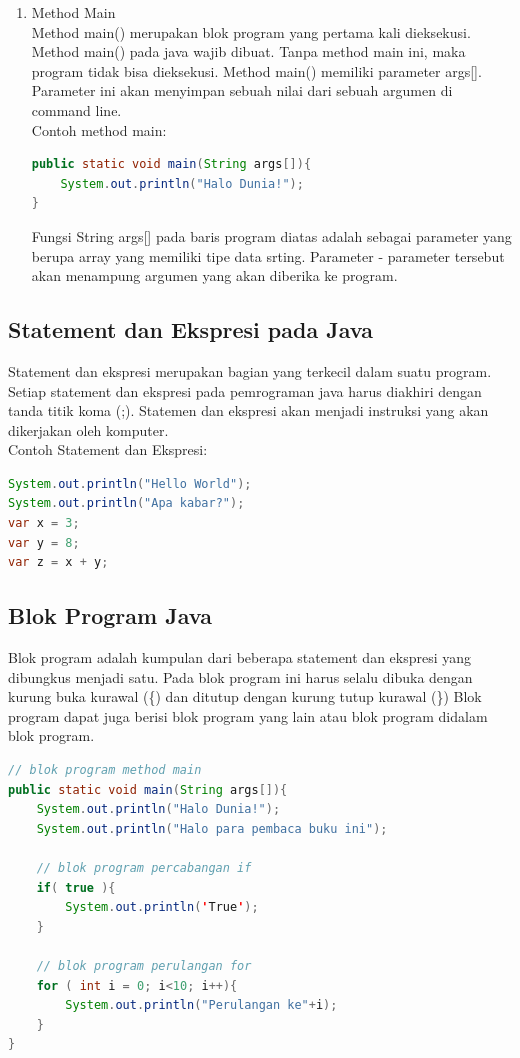 \begin{enumerate}
    \item Method Main\\
    Method main() merupakan blok program yang pertama kali dieksekusi. Method main() pada java wajib dibuat. Tanpa method main ini, maka program tidak bisa dieksekusi. Method main() memiliki parameter args[]. Parameter ini akan menyimpan sebuah nilai dari sebuah argumen di command line.\\
    Contoh method main:
    \begin{lstlisting}[language=Java]
public static void main(String args[]){
    System.out.println("Halo Dunia!");
}
    \end{lstlisting}

    Fungsi \textcolor{pred}{String args[]} pada baris program diatas adalah sebagai parameter yang berupa array yang memiliki tipe data srting. Parameter - parameter tersebut akan menampung argumen yang akan diberika ke program. 

\end{enumerate}

\subsection{Statement dan Ekspresi pada Java}
Statement dan ekspresi merupakan bagian yang terkecil dalam suatu program. Setiap statement dan ekspresi pada pemrograman java harus diakhiri dengan tanda titik koma (;). Statemen dan ekspresi akan menjadi instruksi yang akan dikerjakan oleh komputer.\\
Contoh Statement dan Ekspresi:
\begin{lstlisting}[language=Java]
System.out.println("Hello World");
System.out.println("Apa kabar?");
var x = 3;
var y = 8;
var z = x + y;
\end{lstlisting}

\subsection{Blok Program Java}
Blok program adalah kumpulan dari beberapa statement dan ekspresi yang dibungkus menjadi satu. Pada blok program ini harus selalu dibuka dengan kurung buka kurawal (\{) dan ditutup dengan kurung tutup kurawal (\}) Blok program dapat juga berisi blok program yang lain atau blok program didalam blok program.
\begin{lstlisting}[language=Java]
// blok program method main
public static void main(String args[]){
    System.out.println("Halo Dunia!");
    System.out.println("Halo para pembaca buku ini");

    // blok program percabangan if
    if( true ){
        System.out.println('True');
    }

    // blok program perulangan for 
    for ( int i = 0; i<10; i++){
        System.out.println("Perulangan ke"+i);
    }
}
\end{lstlisting}

